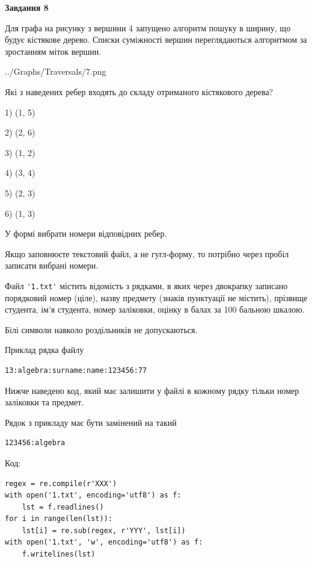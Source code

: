 \documentclass[12pt, ukrainian]{article}
\def\code#1{\Verb!#1!}
\begin{document}
{\begin {large}
{\begin {center}\textbf{Завдання 8}\end {center}}\par
Для графа на рисунку з вершини 4 запущено алгоритм пошуку в ширину, що будує кістякове дерево. Списки суміжності вершин переглядаються алгоритмом за зростанням міток вершин.\par
\begin{center}
	{../Graphs/Traversals/7.png}
\end{center}
\par Які з наведених ребер входять до складу отриманого кістякового дерева?\par
1) (1, 5)\par
2) (2, 6)\par
3) (1, 2)\par
4) (3, 4)\par
5) (2, 3)\par
6) (1, 3)\par
{\vskip 15pt} У формі вибрати номери відповідних ребер.


Якщо заповнюєте текстовий файл, а не гугл-форму, то потрібно через пробіл записа\-ти вибрані номери.\par
\newpage


Файл \code{'1.txt'} містить відомість з рядками, в яких через двокрапку записано поряд\-ковий номер (ціле), назву предмету (знаків пунктуації не містить), прізвище студента, ім'я студента, номер заліковки, оцінку в балах за 100 бальною шкалою.

Білі символи навколо роздільників не допускаються.

Приклад рядка файлу



\begin{verbatim}
13:algebra:surname:name:123456:77
\end{verbatim}


Нижче наведено код, який має залишити у файлі в кожному рядку тільки номер заліковки та предмет.

Рядок з прикладу має бути замінений на такий



\begin{verbatim}
123456:algebra
\end{verbatim}




Код:



\begin{verbatim}
regex = re.compile(r'XXX')
with open('1.txt', encoding='utf8') as f:
    lst = f.readlines()
for i in range(len(lst)):
    lst[i] = re.sub(regex, r'YYY', lst[i])
with open('1.txt', 'w', encoding='utf8') as f:
    f.writelines(lst)
\end{verbatim}







\end{large}}
\end{document}
